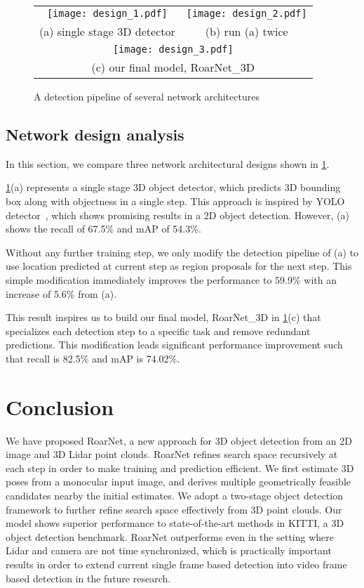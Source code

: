 \documentclass[letterpaper, 10 pt, conference]{ieeeconf}
\begin{document}
\begin{figure}[h]
    \centering
    \begin{tabular}{cc}
    \texttt{[image: design\_1.pdf]}&
    \texttt{[image: design\_2.pdf]}\\
    (a) single stage 3D detector&(b) run (a) twice\\
    \multicolumn{2}{c}{\texttt{[image: design\_3.pdf]}}\\
    \multicolumn{2}{c}{(c) our final model, RoarNet\_3D}\\
    \end{tabular}
    \caption{A detection pipeline of several network architectures}
    \label{fig:network_architecture}
\end{figure}

\subsection{Network design analysis}
In this section, we compare three network architectural designs shown in \cref{fig:network_architecture}.

\cref{fig:network_architecture}(a) represents a single stage 3D object detector, which predicts 3D bounding box along with objectness in a single step. This approach is inspired by YOLO detector~\cite{redmon2016you,redmon2017yolo9000}, which shows promising results in a 2D object detection. However, (a) shows the recall of 67.5\% and mAP of 54.3\%.

Without any further training step, we only modify the detection pipeline of (a) to use location predicted at current step as region proposals for the next step. This simple modification immediately improves the performance to 59.9\% with an increase of 5.6\% from (a).

This result inspires us to build our final model, RoarNet\_3D in \cref{fig:network_architecture}(c) that specializes each detection step to a specific task and remove redundant predictions. This modification leads significant performance improvement such that recall is 82.5\% and mAP is 74.02\%.


\section{Conclusion}

We have proposed RoarNet, a new approach for 3D object detection from an 2D image and 3D Lidar point clouds. RoarNet refines search space recursively at each step in order to make training and prediction efficient. We first estimate 3D poses from a monocular input image, and derives multiple geometrically feasible candidates nearby the initial estimates. We adopt a two-stage object detection framework to further refine search space effectively from 3D point clouds. Our model shows superior performance to state-of-the-art methods in KITTI, a 3D object detection benchmark. RoarNet outperforms even in the setting where Lidar and camera are not time synchronized, which is practically important results in order to extend current single frame based detection into video frame based detection in the future research.
\end{document}
